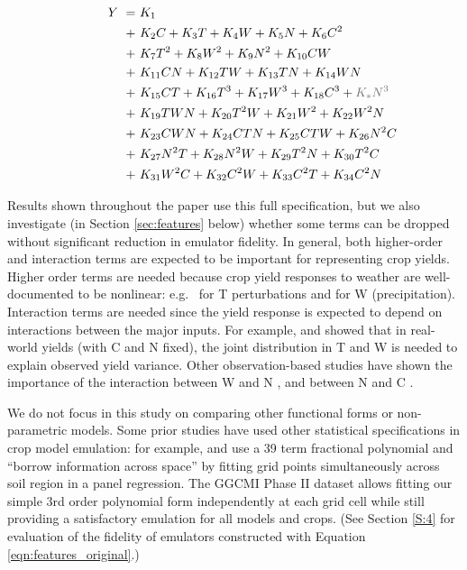\documentclass[gmd, manuscript]{copernicus} %
\begin{document}
\vspace{-0.35in}
\begin{align}
    \hspace{10mm}  \label{eqn:features_original}
    Y\ = \ & K_{1}  \\
    + \ & K_{2} C    + K_{3} T     + K_{4} W   + K_{5} N  + K_{6} C^2 \nonumber \\
    + \ & K_{7} T^2  + K_{8} W^2   + K_{9} N^2 + K_{10} C W           \nonumber \\
    + \ & K_{11} C N + K_{12} T W  + K_{13} T N + K_{14} W N          \nonumber \\
    + \ & K_{15} C T + K_{16} T^3  + K_{17} W^3  + K_{18} C^3 + {\color{dark-gray}K_{*} N^3} \nonumber \\
    + \ & K_{19} T W N + K_{20} T^2 W + K_{21} W^2 + K_{22} W^2 N     \nonumber \\
    + \ & K_{23} C W N + K_{24} C T N + K_{25} C T W + K_{26} N^2 C   \nonumber \\
    + \ & K_{27} N^2 T + K_{28} N^2 W + K_{29} T^2 N + K_{30} T^2 C   \nonumber \\
    + \ & K_{31} W^2 C + K_{32} C^2 W + K_{33} C^2 T + K_{34} C^2 N   \nonumber
\end{align}

Results shown throughout the paper use this full specification, but we also investigate (in Section \ref{sec:features} below) whether some terms can be dropped without significant reduction in emulator fidelity.
In general, both higher-order and interaction terms are expected to be important for representing crop yields. Higher order terms are needed because crop yield responses to weather are well-documented to be nonlinear: e.g.\ \citet{Schlenker2009} for T perturbations and \citet{He2016} for W (precipitation). 
Interaction terms are needed since the yield response is expected to depend on interactions between the major inputs. 
For example, \citet{Lobell2007} and \citet{Tebaldi2008} showed that in real-world yields (with C and N fixed), the joint distribution in T and W is needed to explain observed yield variance.  
Other observation-based studies have shown the importance of the interaction between W and N \citep[e.g.][]{AULAKH2005}, and between N and C \citep{Mitsuru92, Nakamura97}.

We do not focus in this study on comparing other functional forms or non-parametric models.
Some prior studies have used other statistical specifications in crop model emulation: for example, \citet{BLANC2015} and \citet{BLANC2017} use a 39 term fractional polynomial and ``borrow information across space'' by fitting grid points simultaneously across soil region in a panel regression. 
The GGCMI Phase II dataset allows fitting our simple 3rd order polynomial form independently at each grid cell while still providing a satisfactory emulation for all models and crops. 
(See Section \ref{S:4} for evaluation of the fidelity of emulators constructed with Equation \ref{eqn:features_original}.)
\end{document}
